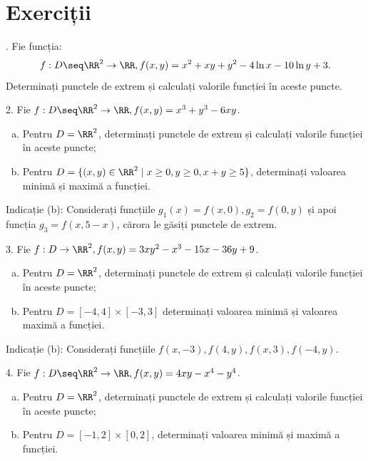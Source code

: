 
\section{Exerciții}

\indent{}. Fie funcția:
\[
  f : D \seq \RR^2 \to \RR, f(x, y) = x^2 + xy + y^2 - 4\ln x - 10 \ln y + 3.
\]
Determinați punctele de extrem și calculați valorile funcției în aceste puncte.

\vspace{1cm}

2. Fie $f : D \seq \RR^2 \to \RR, f(x, y) = x^3 + y^3 - 6xy$.
\begin{enumerate}[(a)]
\item Pentru $D = \RR^2$, determinați punctele de extrem și calculați valorile
  funcției în aceste puncte;
\item Pentru $D = \{ (x,y) \in \RR^2 \mid x \geq 0, y \geq 0, x + y \geq 5 \}$,
  determinați valoarea minimă și maximă a funcției.
\end{enumerate}

Indicație (b): Considerați funcțiile $g_1(x) = f(x,0), g_2 = f(0, y)$ și apoi
funcția $g_3 = f(x, 5-x)$, cărora le găsiți punctele de extrem.

\vspace{1cm}

3. Fie $f : D \to \RR^2, f(x, y) = 3xy^2 - x^3 - 15x - 36y + 9$.
\begin{enumerate}[(a)]
\item Pentru $D = \RR^2$, determinați punctele de extrem și calculați valorile
  funcției în aceste puncte;
\item Pentru $D = [-4, 4] \times [-3, 3]$ determinați valoarea minimă și valoarea
  maximă a funcției.
\end{enumerate}

Indicație (b): Considerați funcțiile $f(x, -3), f(4, y), f(x, 3), f(-4, y)$.

\vspace{1cm}

4. Fie $f : D \seq \RR^2 \to \RR, f(x, y) = 4xy - x^4 - y^4$.
\begin{enumerate}[(a)]
\item Pentru $D = \RR^2$, determinați punctele de extrem și calculați valorile
  funcției în aceste puncte;
\item Pentru $D = [-1, 2] \times [0, 2]$, determinați valoarea minimă și
  maximă a funcției.
\end{enumerate}

